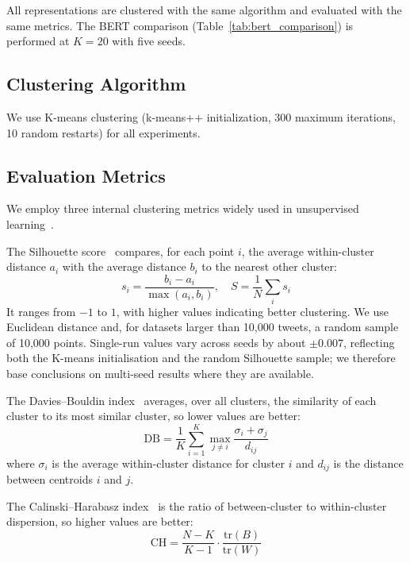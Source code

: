\documentclass[pdflatex,sn-mathphys-num]{sn-jnl}%
\begin{document}
All representations are clustered with the same algorithm and evaluated with the same metrics. The BERT comparison (Table~\ref{tab:bert_comparison}) is performed at $K=20$ with five seeds.

\subsection{Clustering Algorithm}\label{subsec16}

We use K-means clustering (k-means++ initialization, 300 maximum iterations, 10 random restarts) for all experiments.

\subsection{Evaluation Metrics}\label{subsec17}

We employ three internal clustering metrics widely used in unsupervised learning~\cite{arbelaitz2013}.

The Silhouette score~\cite{rousseeuw1987} compares, for each point $i$, the average within-cluster distance $a_i$ with the average distance $b_i$ to the nearest other cluster:
\begin{equation}
s_i = \frac{b_i - a_i}{\max(a_i, b_i)}, \quad S = \frac{1}{N}\sum_i s_i
\end{equation}
It ranges from $-1$ to $1$, with higher values indicating better clustering. We use Euclidean distance and, for datasets larger than 10,000 tweets, a random sample of 10,000 points. Single-run values vary across seeds by about $\pm 0.007$, reflecting both the K-means initialisation and the random Silhouette sample; we therefore base conclusions on multi-seed results where they are available.

The Davies--Bouldin index~\cite{davies1979} averages, over all clusters, the similarity of each cluster to its most similar cluster, so lower values are better:
\begin{equation}
\text{DB} = \frac{1}{K}\sum_{i=1}^K \max_{j \neq i} \frac{\sigma_i + \sigma_j}{d_{ij}}
\end{equation}
where $\sigma_i$ is the average within-cluster distance for cluster $i$ and $d_{ij}$ is the distance between centroids $i$ and $j$.

The Calinski--Harabasz index~\cite{calinski1974} is the ratio of between-cluster to within-cluster dispersion, so higher values are better:
\begin{equation}
\text{CH} = \frac{N - K}{K - 1} \cdot \frac{\text{tr}(B)}{\text{tr}(W)}
\end{equation}
\end{document}
